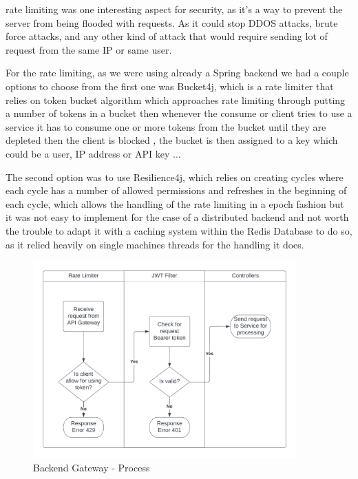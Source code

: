 rate limiting was one interesting aspect for security, as it's a way to prevent the
server from being flooded with requests. As it could stop DDOS attacks, brute force
attacks, and any other kind of attack that would require sending lot of request from 
the same IP or same user.

For the rate limiting, as we were using already a Spring backend we had a couple options
to choose from the first one was Bucket4j, which is a rate limiter that relies on token
bucket algorithm which approaches rate limiting through putting a number of tokens in a
bucket then whenever the consume or client tries to use a service it has to consume one
or more tokens from the bucket until they are depleted then the client is blocked \cite{b4j},
the bucket is then assigned to a key which could be a user, IP address or API key ...

The second option was to use Resilience4j, which relies on creating cycles where each cycle
has a number of allowed permissions and refreshes in the beginning of each cycle\cite{r4j}, which
allows the handling of the rate limiting in a epoch fashion but it was not easy to
implement for the case of a distributed backend and not worth the trouble to adapt it
with a caching system within the Redis Database to do so, as it relied heavily on
single machines threads for the handling it does.

\begin{figure}[!ht]
    \centering
    \includegraphics[width=0.9\textwidth]{images/Flow chart b4j.png}
    \caption{\footnotesize{Backend Gateway - Process}}
    \label{fig:b4j}
\end{figure}

